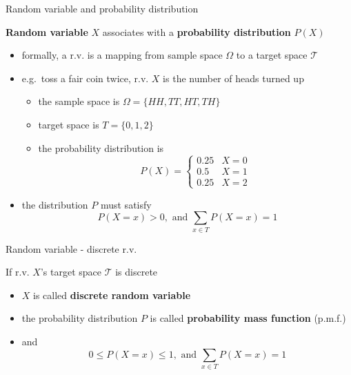 \documentclass{scrartcl}
\def\tightlist{}
\begin{document}
\begin{frame}{Random variable and probability distribution}
\protect\hypertarget{random-variable-and-probability-distribution}{}

\textbf{Random variable} \(X\) associates with a \textbf{probability
distribution} \(P(X)\)

\begin{itemize}
\tightlist
\item
  formally, a r.v. is a mapping from sample space \(\Omega\) to a target
  space \(\mathcal{T}\)
\item
  e.g.~toss a fair coin twice, r.v. \(X\) is the number of heads turned
  up

  \begin{itemize}
  \tightlist
  \item
    the sample space is \(\Omega =\{HH, TT, HT, TH\}\)
  \item
    target space is \(T =\{0,1,2\}\)
  \item
    the probability distribution is \[P(X) = \begin{cases} 0.25 & X=0 \\
    0.5 & X=1 \\
    0.25 & X=2 \end{cases}\]
  \end{itemize}
\item
  the distribution \(P\) must satisfy
  \[P(X=x) >0, \text{ and } \sum_{x\in T} P(X=x) =1\]
\end{itemize}

\end{frame}

\begin{frame}{Random variable - discrete r.v.}
\protect\hypertarget{random-variable---discrete-r.v.}{}

If r.v. \(X\)'s target space \(\mathcal{T}\) is discrete

\begin{itemize}
\tightlist
\item
  \(X\) is called \textbf{discrete random variable}
\item
  the probability distribution \(P\) is called \textbf{probability mass
  function} (p.m.f.)
\item
  and \[0\leq P(X=x) \leq 1, \text{ and } \sum_{x\in T} P(X=x) =1\]
\end{itemize}

\end{frame}
\end{document}
